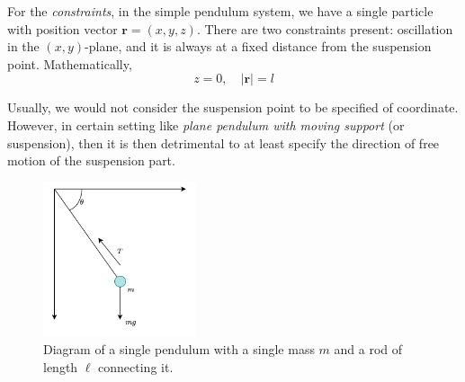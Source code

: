 For the \textit{constraints}, in the simple pendulum system, we have a single particle with position vector $\mathbf{r}=(x,y,z)$. There are two constraints present: oscillation in the $(x,y)$-plane, and it is always at a fixed distance from the suspension point. Mathematically, 
\begin{equation}
  z=0, \quad \lvert \mathbf{r} \rvert = l
\end{equation}

Usually, we would not consider the suspension point to be specified of coordinate. However, in certain setting like \textit{plane pendulum with moving support} (or suspension), then it is then detrimental to at least specify the direction of free motion of the suspension part. 

\begin{figure}[h!]
  \centering
  \includegraphics[width=0.4\textwidth]{img/expreise.png}
  \caption{Diagram of a single pendulum with a single mass $m$ and a rod of length $\ell$ connecting it.}
  \label{fig:pendulum1}
\end{figure}

